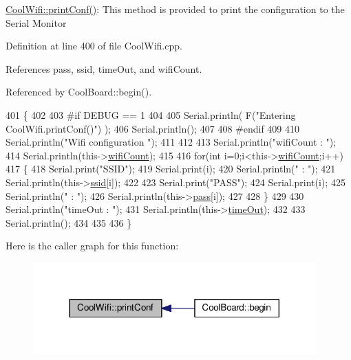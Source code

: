 \hyperlink{classCoolWifi_a9e6105c6d13d35ec510f6633da9e0223}{Cool\+Wifi\+::print\+Conf()}\+: This method is provided to print the configuration to the Serial Monitor 

Definition at line 400 of file Cool\+Wifi.\+cpp.



References pass, ssid, time\+Out, and wifi\+Count.



Referenced by Cool\+Board\+::begin().


\begin{DoxyCode}
401 \{
402 
403 \textcolor{preprocessor}{#if DEBUG == 1 }
404 
405     Serial.println( F(\textcolor{stringliteral}{"Entering CoolWifi.printConf()"}) );
406     Serial.println();   
407 
408 \textcolor{preprocessor}{#endif}
409     
410     Serial.println(\textcolor{stringliteral}{"Wifi configuration "});
411 
412     
413     Serial.println(\textcolor{stringliteral}{"wifiCount : "});
414     Serial.println(this->\hyperlink{classCoolWifi_ab133bd92fcb895b884deecd6678592e4}{wifiCount});
415     
416     \textcolor{keywordflow}{for}(\textcolor{keywordtype}{int} i=0;i<this->\hyperlink{classCoolWifi_ab133bd92fcb895b884deecd6678592e4}{wifiCount};i++)
417     \{   
418         Serial.print(\textcolor{stringliteral}{"SSID"});
419         Serial.print(i);
420         Serial.println(\textcolor{stringliteral}{" : "});
421         Serial.println(this->\hyperlink{classCoolWifi_a893b21d0fed821438733bba2e73fb4c2}{ssid}[i]);
422                 
423         Serial.print(\textcolor{stringliteral}{"PASS"});
424         Serial.print(i);
425         Serial.println(\textcolor{stringliteral}{" : "});
426         Serial.println(this->\hyperlink{classCoolWifi_a0c3332a149245aaad060b32593a54c9b}{pass}[i]);
427         
428     \}
429     
430     Serial.println(\textcolor{stringliteral}{"timeOut : "});
431     Serial.println(this->\hyperlink{classCoolWifi_a952111605f25156588b5632caaba1c6f}{timeOut});
432 
433     Serial.println();
434 
435 
436 \}
\end{DoxyCode}
Here is the caller graph for this function\+:
\nopagebreak
\begin{figure}[H]
\begin{center}
\leavevmode
\includegraphics[width=308pt]{classCoolWifi_a9e6105c6d13d35ec510f6633da9e0223_icgraph}
\end{center}
\end{figure}
\mbox{\label{classCoolWifi_a1c7b4d82a4098d346e7593dce92039fa}} 
